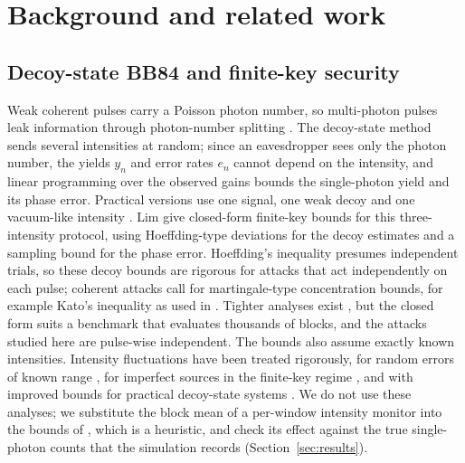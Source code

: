 \section{Background and related work}\label{sec:background}

\subsection{Decoy-state BB84 and finite-key security}
Weak coherent pulses carry a Poisson photon number, so multi-photon pulses leak information through photon-number splitting \cite{brassard2000}. The decoy-state method \cite{hwang2003,lo2005,wang2005} sends several intensities at random; since an eavesdropper sees only the photon number, the yields $y_n$ and error rates $e_n$ cannot depend on the intensity, and linear programming over the observed gains bounds the single-photon yield and its phase error. Practical versions use one signal, one weak decoy and one vacuum-like intensity \cite{ma2005}. Lim \etal \cite{lim2014} give closed-form finite-key bounds for this three-intensity protocol, using Hoeffding-type deviations for the decoy estimates and a sampling bound for the phase error. Hoeffding's inequality presumes independent trials, so these decoy bounds are rigorous for attacks that act independently on each pulse; coherent attacks call for martingale-type concentration bounds, for example Kato's inequality as used in \cite{zhang2017}. Tighter analyses exist \cite{tomamichel2012}, but the closed form suits a benchmark that evaluates thousands of blocks, and the attacks studied here are pulse-wise independent. The bounds also assume exactly known intensities. Intensity fluctuations have been treated rigorously, for random errors of known range \cite{wang2007}, for imperfect sources in the finite-key regime \cite{mizutani2015}, and with improved bounds for practical decoy-state systems \cite{zhang2017}. We do not use these analyses; we substitute the block mean of a per-window intensity monitor into the bounds of \cite{lim2014}, which is a heuristic, and check its effect against the true single-photon counts that the simulation records (Section~\ref{sec:results}).

